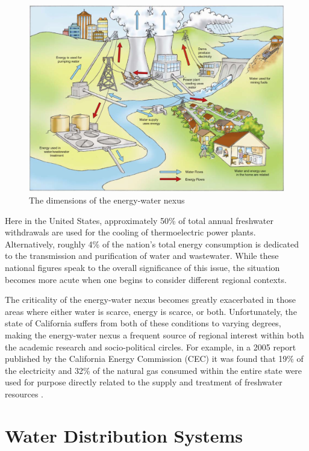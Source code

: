      \begin{figure}[!h]
       \centering
       \includegraphics[width=5.5in]{figures/energy-water-nexus-dimensions.png}
       \caption[Dimensions of the Energy-Water Nexus]{The dimensions of the energy-water nexus \cite{Pate2007}}
       \label{fig:energy-water-dimensions}
     \end{figure}
    
Here in the United States, approximately 50\% of total annual freshwater withdrawals are used for the cooling of thermoelectric power plants. Alternatively, roughly 4\% of the nation's total energy consumption is dedicated to the transmission and purification of water and wastewater. While these national figures speak to the overall significance of this issue, the situation becomes more acute when one begins to consider different regional contexts. 
    
The criticality of the energy-water nexus becomes greatly exacerbated in those areas where either water is scarce, energy is scarce, or both. Unfortunately, the state of California suffers from both of these conditions to varying degrees, making the energy-water nexus a frequent source of regional interest within both the academic research and socio-political circles. For example, in a 2005 report published by the California Energy Commission (CEC) it was found that 19\% of the electricity and 32\% of the natural gas consumed within the entire state were used for purpose directly related to the supply and treatment of freshwater resources \cite{Horvath2005}.
    
\section{Water Distribution Systems}
    
